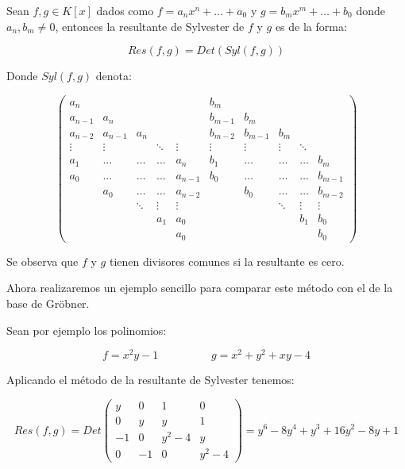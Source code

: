 \begin{definition}
	Sean $f, g \in K[x]$ dados como $f = a_n x^n + \dotso + a_0$ y $g = b_m x^m + \dotso + b_0$ donde $a_n, b_m \neq 0$, entonces la resultante de Sylvester de $f$ y $g$ es de la forma:
	
	$$Res(f,g) = Det(Syl(f,g))$$
	
	Donde $Syl(f,g)$ denota:
	
	$$\begin{pmatrix}
	a_n & & & & & b_m & & & & \\
	a_{n-1} & a_n & & & & b_{m-1} & b_m & & & \\
	a_{n-2} & a_{n-1} & a_n & & & b_{m-2} & b_{m-1} & b_m & & \\
	\vdots & \vdots & & \ddots & \vdots & \vdots & \vdots & \vdots & \ddots & \\
	a_1 & \dotso & \dotso & \dotso & a_{n} & b_1 & \dotso & \dotso & \dotso & b_{m} \\
	a_0 & \dotso & \dotso & \dotso & a_{n-1} & b_0 & \dotso & \dotso & \dotso & b_{m-1} \\
	 & a_0 & \dotso & \dotso & a_{n-2} & & b_0 & \dotso & \dotso & b_{m-2} \\
	 & & \ddots & \vdots & \vdots & & & \ddots & \vdots & \vdots \\
	 & & & a_1 & a_0 & & & & b_1 & b_0 \\
	 & & & & a_0 & & & & & b_0
	\end{pmatrix}$$
	
	Se observa que $f$ y $g$ tienen divisores comunes si la resultante es cero.
	
\end{definition}

Ahora realizaremos un ejemplo sencillo para comparar este método con el de la base de Gröbner.
\\
\par Sean por ejemplo los polinomios:

$$f = x^2 y - 1 \hspace{2cm} g = x^2 + y^2 + xy - 4$$

Aplicando el método de la resultante de Sylvester tenemos:

$$Res(f,g) = Det \begin{pmatrix}
y & 0 & 1 & 0 \\
0 & y & y & 1 \\
-1 & 0 & y^2 - 4 & y \\
0 & -1 & 0 & y^2 - 4
\end{pmatrix} = y^6 - 8y^4 + y^3 + 16y^2 - 8y + 1$$

